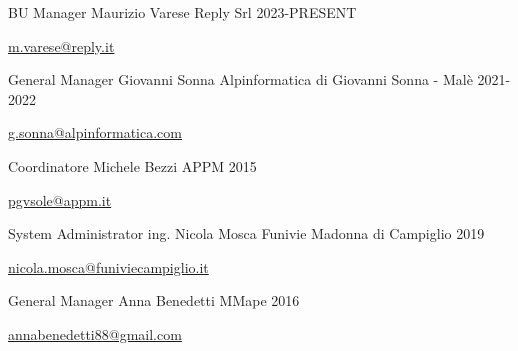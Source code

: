 

\begin{cventries}

  \cventry
    {BU Manager} %
    {Maurizio Varese} %
    {Reply Srl} %
    {2023-PRESENT} %
    {
      \begin{cvitems} %
        \item {\href{mailto:m.varese@reply.it}{m.varese@reply.it}}
      \end{cvitems}
    }

  \cventry
    {General Manager} %
    {Giovanni Sonna} %
    {Alpinformatica di Giovanni Sonna - Malè} %
    {2021-2022} %
    {
      \begin{cvitems} %
        \item {\href{mailto:g.sonna@alpinformatica.com}{g.sonna@alpinformatica.com}}
      \end{cvitems}
    }

  \cventry
    {Coordinatore} %
    {Michele Bezzi} %
    {APPM} %
    {2015} %
    {
      \begin{cvitems} %
        \item {\href{mailto:pgvsole@appm.it}{pgvsole@appm.it}}
      \end{cvitems}
    }

  \cventry
    {System Administrator} %
    {ing. Nicola Mosca} %
    {Funivie Madonna di Campiglio} %
    {2019} %
    {
      \begin{cvitems} %
        \item {\href{mailto:nicola.mosca@funiviecampiglio.it}{nicola.mosca@funiviecampiglio.it}}
      \end{cvitems}
    }

  \cventry
    {General Manager} %
    {Anna Benedetti} %
    {MMape} %
    {2016} %
    {
      \begin{cvitems} %
        \item {\href{mailto:annabenedetti88@gmail.com}{annabenedetti88@gmail.com}}
      \end{cvitems}
    }
 
\end{cventries}
